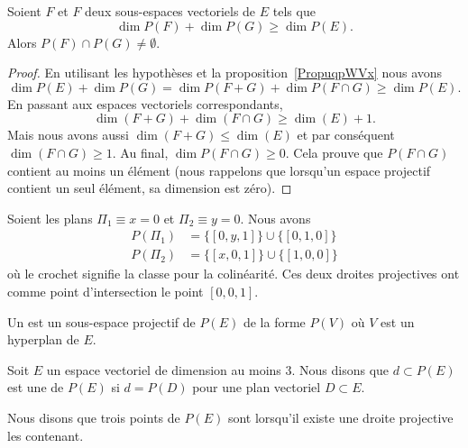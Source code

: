 \begin{theorem}[incidence]
    Soient \( F\) et \( F\) deux sous-espaces vectoriels de \( E\) tels que
    \begin{equation}
        \dim P(F)+\dim P(G)\geq \dim P(E).
    \end{equation}
    Alors \( P(F)\cap P(G)\neq \emptyset\).
\end{theorem}

\begin{proof}
    En utilisant les hypothèses et la proposition~\ref{PropuqpWVx} nous avons
    \begin{equation}
        \dim P(E)+\dim P(G)=\dim P(F+G)+\dim P(F\cap G)\geq \dim P(E).
    \end{equation}
    En passant aux espaces vectoriels correspondants,
    \begin{equation}
        \dim(F+G)+\dim(F\cap G)\geq \dim(E)+1.
    \end{equation}
    Mais nous avons aussi \( \dim(F+G)\leq \dim(E)\) et par conséquent \( \dim(F\cap G)\geq 1\). Au final, \( \dim P(F\cap G)\geq 0\). Cela prouve que \( P(F\cap G)\) contient au moins un élément (nous rappelons que lorsqu'un espace projectif contient un seul élément, sa dimension est zéro).
\end{proof}

\begin{example}
    Soient les plans \( \Pi_1\equiv x=0\) et \( \Pi_2\equiv y=0\). Nous avons
    \begin{subequations}
        \begin{align}
            P(\Pi_1)&=\{ [0,y,1] \}\cup\{ [0,1,0] \}\\
            P(\Pi_2)&=\{ [x,0,1] \}\cup\{ [1,0,0] \}
        \end{align}
    \end{subequations}
    où le crochet signifie la classe pour la colinéarité. Ces deux droites projectives ont comme point d'intersection le point \( [0,0,1]\).
\end{example}

\begin{definition}
    Un  est un sous-espace projectif de \( P(E)\) de la forme \( P(V)\) où \( V\) est un hyperplan de \( E\).
\end{definition}

\begin{definition}      \label{DEFooBBMBooSVgTnn}
    Soit \( E\) un espace vectoriel de dimension au moins \( 3\). Nous disons que \( d\subset P(E)\) est une  de \( P(E)\) si \( d=P(D)\) pour une plan vectoriel \( D\subset E\).

    Nous disons que trois points de \( P(E)\) sont  lorsqu'il existe une droite projective les contenant.
\end{definition}

